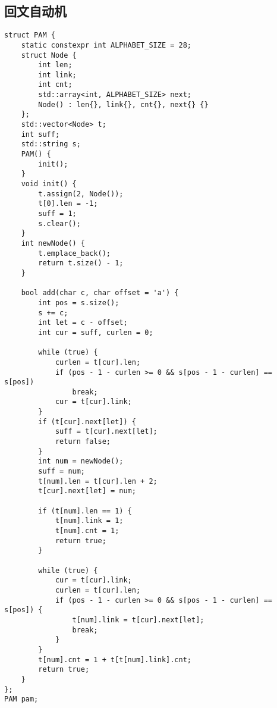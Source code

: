 \subsection{回文自动机}
\begin{lstlisting}
struct PAM {
    static constexpr int ALPHABET_SIZE = 28;
    struct Node {
        int len;
        int link;
        int cnt;
        std::array<int, ALPHABET_SIZE> next;
        Node() : len{}, link{}, cnt{}, next{} {}
    };
    std::vector<Node> t;
    int suff;
    std::string s;
    PAM() {
        init();
    }
    void init() {
        t.assign(2, Node());
        t[0].len = -1;
        suff = 1;
        s.clear();
    }
    int newNode() {
        t.emplace_back();
        return t.size() - 1;
    }
     
    bool add(char c, char offset = 'a') {
        int pos = s.size();
        s += c;
        int let = c - offset;
        int cur = suff, curlen = 0;
 
        while (true) {
            curlen = t[cur].len;
            if (pos - 1 - curlen >= 0 && s[pos - 1 - curlen] == s[pos])
                break;
            cur = t[cur].link;
        }
        if (t[cur].next[let]) {  
            suff = t[cur].next[let];
            return false;
        }
        int num = newNode();
        suff = num;
        t[num].len = t[cur].len + 2;
        t[cur].next[let] = num;
 
        if (t[num].len == 1) {
            t[num].link = 1;
            t[num].cnt = 1;
            return true;
        }
 
        while (true) {
            cur = t[cur].link;
            curlen = t[cur].len;
            if (pos - 1 - curlen >= 0 && s[pos - 1 - curlen] == s[pos]) {
                t[num].link = t[cur].next[let];
                break;
            }
        }
        t[num].cnt = 1 + t[t[num].link].cnt;
        return true;
    }
};
PAM pam;
\end{lstlisting}



